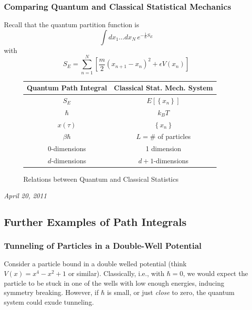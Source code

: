 \documentclass{article}
\begin{document}
	\subsubsection{Comparing Quantum and Classical Statistical Mechanics}
	Recall that the quantum partition function is
	$$\int dx_1\ldots dx_N\,e^{-\frac{1}{\hbar}S_{E}}$$
	with
	$$S_E=\sum_{n=1}^N\left[\frac{m}{2}\left(x_{n+1}-x_n\right)^2+\epsilon V(x_n)\right]$$
	\begin{center}
	\begin{figure}[h]
	\centering
	\begin{tabular}{c|c}
	Quantum Path Integral & Classical Stat. Mech. System\\
	\hline
	$S_E$ & $E\left[\left\{x_n\right\}\right]$\\
	$\hbar$ & $k_BT$\\
	$x(\tau)$ & $\left\{x_n\right\}$\\
	$\beta\hbar$ & $L=$\# of particles\\
	0-dimensions & 1 dimension\\
	$d$-dimensions & $d+1$-dimensions
	\end{tabular}
	\caption{Relations between Quantum and Classical Statistics}
	\end{figure}
	\end{center}
	\textit{April 20, 2011}
	\subsection{Further Examples of Path Integrals}
	\subsubsection{Tunneling of Particles in a Double-Well Potential}
	Consider a particle bound in a double welled potential (think $V(x)=x^4-x^2+1$ or similar). Classically, i.e., with $\hbar=0$, we would expect the particle to be stuck in one of the wells with low enough energies, inducing symmetry breaking. However, if $\hbar$ is small, or just \emph{close} to zero, the quantum system could exude tunneling.\\
	
\end{document}
